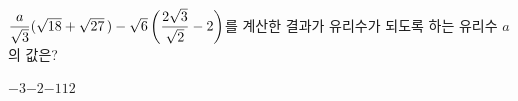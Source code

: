 $\dfrac{a}{\sqrt{3}}(\sqrt{18}+\sqrt{27}\mkern3mu )-\sqrt{6}\left(\dfrac{2\sqrt{3}}{\sqrt{2}}-2\right)$를 계산한 결과가 유리수가 되도록 하는 유리수 $a$의 값은?
\begin{choices32}{$-3$}{$-2$}{$-1$}{$1$}{$2$}\end{choices32}
